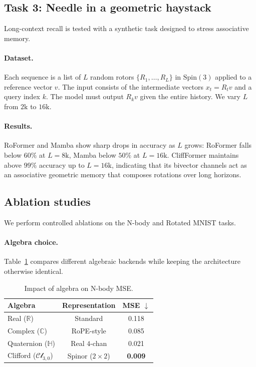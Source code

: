 \documentclass{article}
\theoremstyle{plain}
\theoremstyle{definition}
\theoremstyle{remark}
\newcommand{\cliff}{\mathcal{Cl}}
\newcommand{\R}{\mathbb{R}}
\newcommand{\C}{\mathbb{C}}
\newcommand{\Hq}{\mathbb{H}}
\begin{document}
\subsection{Task 3: Needle in a geometric haystack}

Long-context recall is tested with a synthetic task designed to stress associative memory.

\paragraph{Dataset.}
Each sequence is a list of $L$ random rotors $\{R_1,\dots,R_L\}$ in $\mathrm{Spin}(3)$ applied to a reference vector $v$. The input consists of the intermediate vectors $x_t = R_t v$ and a query index $k$. The model must output $R_k v$ given the entire history. We vary $L$ from $2\mathrm{k}$ to $16\mathrm{k}$.

\paragraph{Results.}
RoFormer and Mamba show sharp drops in accuracy as $L$ grows: RoFormer falls below $60\%$ at $L=8\mathrm{k}$, Mamba below $50\%$ at $L=16\mathrm{k}$. CliffFormer maintains above $99\%$ accuracy up to $L=16\mathrm{k}$, indicating that its bivector channels act as an associative geometric memory that composes rotations over long horizons.

\subsection{Ablation studies}
\label{sec:ablations}

We perform controlled ablations on the N-body and Rotated MNIST tasks.

\paragraph{Algebra choice.}
Table~\ref{tab:algebra_ablation} compares different algebraic backends while keeping the architecture otherwise identical.

\begin{table}[h]
\caption{Impact of algebra on N-body MSE.}
\label{tab:algebra_ablation}
\vskip 0.1in
\begin{center}
\begin{small}
\begin{sc}
\begin{tabular}{lcc}
\toprule
Algebra & Representation & MSE $\downarrow$ \\
\midrule
Real ($\R$) & Standard & 0.118 \\
Complex ($\C$) & RoPE-style & 0.085 \\
Quaternion ($\Hq$) & Real $4$-chan & 0.021 \\
Clifford ($\cliff_{3,0}$) & Spinor ($2\times2$) & \textbf{0.009} \\
\bottomrule
\end{tabular}
\end{sc}
\end{small}
\end{center}
\vskip -0.1in
\end{table}
\end{document}
